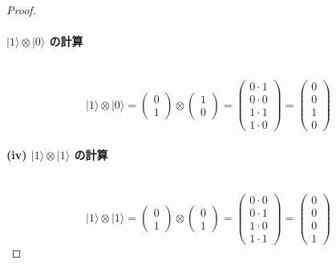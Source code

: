 \documentclass[dvipdfmx,a4paper]{jsarticle}
\theoremstyle{mystyle}
\begin{document}
\begin{proof}
\paragraph{\textbf{$|1\rangle\otimes|0\rangle$ の計算}} \ \\
\[
|1\rangle\otimes|0\rangle
=
\begin{pmatrix}
0\\
1
\end{pmatrix}
\otimes
\begin{pmatrix}
1\\
0
\end{pmatrix}
=
\begin{pmatrix}
0\cdot 1\\
0\cdot 0\\
1\cdot 1\\
1\cdot 0
\end{pmatrix}
=
\begin{pmatrix}
0\\
0\\
1\\
0
\end{pmatrix}
\]

\paragraph{\textbf{(iv) $|1\rangle\otimes|1\rangle$ の計算}} \ \\
\[
|1\rangle\otimes|1\rangle
=
\begin{pmatrix}
0\\
1
\end{pmatrix}
\otimes
\begin{pmatrix}
0\\
1
\end{pmatrix}
=
\begin{pmatrix}
0\cdot 0\\
0\cdot 1\\
1\cdot 0\\
1\cdot 1
\end{pmatrix}
=
\begin{pmatrix}
0\\
0\\
0\\
1
\end{pmatrix}
\]


\end{proof}
\end{document}
